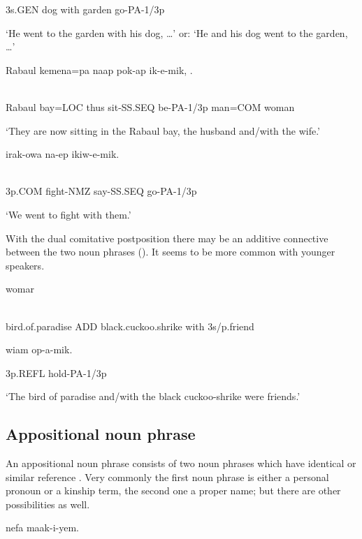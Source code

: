 3s.GEN  dog  with  garden  go-PA-1/3p

`He went to the garden with his dog, {\dots}' or: `He and his dog went to the garden, {\dots}'

\ea%
\label{ex:x832}
\gll Rabaul  kemena=pa  naap  pok-ap  ik-e-mik,  . \\
      \\
\glt
\z

Rabaul  bay=LOC  thus  sit-SS.SEQ  be-PA-1/3p  man=COM  woman

`They are now sitting in the Rabaul bay, the husband and/with the wife.'

\ea%
\label{ex:x831}
\gll {}  irak-owa  na-ep  ikiw-e-mik. \\
      \\
\glt
\z

3p.COM  fight-NMZ  say-SS.SEQ  go-PA-1/3p

`We went to fight with them.'

With the dual comitative postposition   there may be an additive connective  between the two noun phrases (). It seems to be more common with younger speakers. 

\ea%
\label{ex:x820}
\gll {}  womar  \\
      \\
\glt
\z

bird.of.paradise  ADD  black.cuckoo.shrike  with  3s/p.friend  

wiam  op-a-mik.

3p.REFL  hold-PA-1/3p

`The bird of paradise and/with the black cuckoo-shrike were friends.'

\subsection{Appositional noun phrase}
\hypertarget{RefHeading21721935131865}{}
An appositional noun phrase consists of two noun phrases which have identical or similar reference \citep[24]{Crystal1997}.  Very commonly the first noun phrase is either a personal pronoun or a kinship term, the second one a proper name; but there are other possibilities as well.  

\ea%
\label{ex:x835}
\gll {}  nefa  maak-i-yem. \\
      \\
\glt
\z

